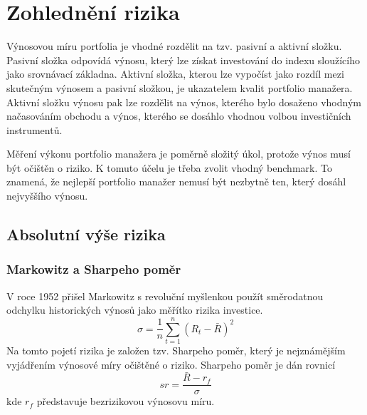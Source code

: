 \documentclass[a4paper]{book}
\begin{document}
\section{Zohlednění rizika}

Výnosovou míru portfolia je vhodné rozdělit na tzv. pasivní a aktivní složku. Pasivní složka odpovídá výnosu, který lze získat investování do indexu sloužícího jako srovnávací základna. Aktivní složka, kterou lze vypočíst jako rozdíl mezi skutečným výnosem a pasivní složkou, je ukazatelem kvalit portfolio manažera. Aktivní složku výnosu pak lze rozdělit na výnos, kterého bylo dosaženo vhodným načasováním obchodu a výnos, kterého se dosáhlo vhodnou volbou investičních instrumentů.

Měření výkonu portfolio manažera je poměrně složitý úkol, protože výnos musí být očištěn o riziko. K tomuto účelu je třeba zvolit vhodný benchmark. To znamená, že nejlepší portfolio manažer nemusí být nezbytně ten, který dosáhl nejvyššího výnosu.

\subsection{Absolutní výše rizika}

\subsubsection{Markowitz a Sharpeho poměr}

V roce 1952 přišel Markowitz s revoluční myšlenkou použít směrodatnou odchylku historických výnosů jako měřítko rizika investice.
\begin{equation*}
\sigma = \frac{1}{n} \sum_{t = 1}^n (R_t - \bar{R})^2
\end{equation*}
Na tomto pojetí rizika je založen tzv. Sharpeho poměr, který je nejznámějším vyjádřením výnosové míry očištěné o riziko. Sharpeho poměr je dán rovnicí
\begin{equation*}
sr = \frac{\bar{R} - r_f}{\sigma}
\end{equation*}
kde $r_f$ představuje bezrizikovou výnosovu míru.
\end{document}

